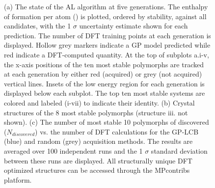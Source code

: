 \begin{figure}[!htb]
\centering
{}
\caption{\label{fig:iro3_al}
%
(a) The state of the AL algorithm at five generations.
%
The enthalpy of formation per atom (\DHf) is plotted, ordered by stability, against all \IrOthree candidates, with the 1 $\sigma$ uncertainty estimate shown for each prediction.
%
The number of DFT training points at each generation is displayed.
%
Hollow grey markers indicate a GP model predicted \DHf while red indicate a DFT-computed quantity.
%
At the top of subplots a.i-v, the x-axis positions of the ten most stable polymorphs are tracked at each generation by either red (acquired) or grey (not acquired) vertical lines.
%
Insets of the low energy region for each generation is displayed below each subplot.
%
The top ten most stable systems are colored and labeled (i-vii) to indicate their identity.
%
(b) Crystal structures of the \num{8} most stable \IrOthree polymorphs (structure iii. not shown).
%
%
(c) The number of most stable \num{10} polymorphs of \IrOthree discovered ($N_{discovered}$) vs. the number of DFT calculations for the GP-LCB (blue) and random (grey) acquisition methods.
%
The results are averaged over \num{100} independent runs and the 1 $\sigma$ standard deviation between these runs are displayed.
%
All structurally unique \IrOx DFT optimized structures can be accessed through the MPcontribs platform.~\cite{upload_MPContribs}
}
\end{figure}


